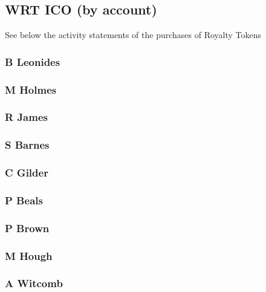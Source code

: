 \documentclass[letterpaper,10pt,english]{sphinxmanual}
\begin{document}
\subsection{WRT ICO (by account)}
\label{\detokenize{investors:wrt-ico-by-account}}
See below the activity statements of the purchases of Royalty Tokens


\subsubsection{B Leonides}
\label{\detokenize{investors:b-leonides}}

\subsubsection{M Holmes}
\label{\detokenize{investors:m-holmes}}

\subsubsection{R James}
\label{\detokenize{investors:r-james}}

\subsubsection{S Barnes}
\label{\detokenize{investors:s-barnes}}

\subsubsection{C Gilder}
\label{\detokenize{investors:c-gilder}}

\subsubsection{P Beals}
\label{\detokenize{investors:p-beals}}

\subsubsection{P Brown}
\label{\detokenize{investors:p-brown}}

\subsubsection{M Hough}
\label{\detokenize{investors:m-hough}}

\subsubsection{A Witcomb}
\label{\detokenize{investors:a-witcomb}}
\end{document}
